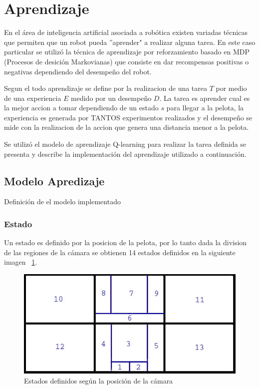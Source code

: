 
\section{Aprendizaje}
 
En el área de inteligencia artificial asociada a robótica existen variadas técnicas que permiten que un robot pueda ''aprender" a realizar alguna tarea. En este caso particular se utiliz\'o la técnica de aprendizaje por reforzamiento basado en MDP (Procesos de desici\'on Markovianas) que consiste en dar recompensas positivas o negativas dependiendo del desempeño del robot.


Segun el \cite{Mitchell} todo aprendizaje se define por la realizacion de una tarea $T$ por medio de una experiencia $E$ medido por un desempeño $D$. La tarea es aprender cual es la mejor accion a tomar dependiendo de un estado $s$ para llegar a la pelota, la experiencia es generada por TANTOS experimentos realizados y el desempeño se mide con la realizacion de la accion que genera una distancia menor a la pelota.

Se utilizó el modelo de aprendizaje Q-learning para realizar la tarea definida se presenta y describe la implementación del aprendizaje utilizado a continuación.

\subsection{Modelo Apredizaje}

Definici\'on de el modelo implementado

\subsubsection{Estado}

Un estado es definido por la posicion de la pelota, por lo tanto dada la division de las regiones de la c\'amara  se  obtienen 14 estados definidos en la siguiente imagen ~\ref{fig:estados}.

\begin{figure}[hbtp]
\centering
\includegraphics[scale=0.5]{imagenes/Regiones.jpg}
\caption{Estados definidos seg\'un la posici\'on de la c\'amara}
\label{fig:estados}
\end{figure}

